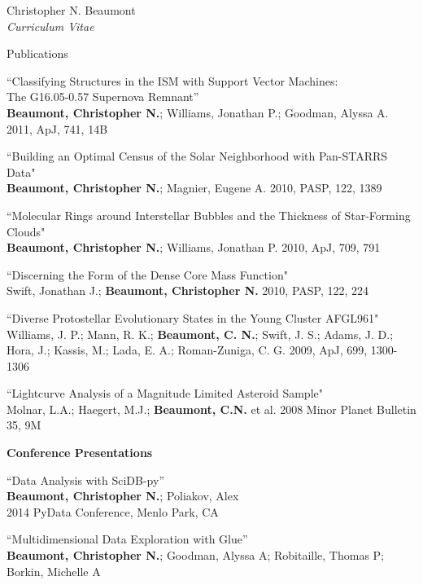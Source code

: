 \documentclass[10pt]{article}
\newenvironment{sublist}{%
	\begin{list}{}{%
		\setlength{\itemsep}{0em}\setlength{\parsep}{0em}%
		\setlength{\topsep}{0em}\setlength{\parskip}{0em}%
	}%
}%
{ \end{list} }
\begin{document}
\begin{cv}{Christopher N. Beaumont\\{\large \itshape Curriculum Vitae}}
\begin{cvlist}{Publications}
\begin{sublist}
	\item ``Classifying Structures in the ISM with Support Vector Machines: \\The G16.05-0.57 Supernova Remnant'' \\
		\textbf{Beaumont, Christopher N.}; Williams, Jonathan P.; Goodman, Alyssa A. 2011, ApJ, 741, 14B\\
	\item ``Building an Optimal Census of the Solar Neighborhood with Pan-STARRS Data" \\
		\textbf{Beaumont, Christopher N.}; Magnier, Eugene A. 2010, PASP, 122, 1389 \\
	\item ``Molecular Rings around Interstellar Bubbles and the Thickness of Star-Forming Clouds" \\
		\textbf{Beaumont, Christopher N.}; Williams, Jonathan P. 2010, ApJ, 709, 791 \\
	\item  ``Discerning the Form of the Dense Core Mass Function" \\
		Swift, Jonathan J.; \textbf{Beaumont, Christopher N.} 2010, PASP, 122, 224 \\
	\item ``Diverse Protostellar Evolutionary States in the Young Cluster AFGL961"  \\
	Williams, J. P.; Mann, R. K.; \textbf{Beaumont, C. N.}; Swift, J. S.; Adams, J. D.; Hora, J.; Kassis, M.; Lada, E. A.; Roman-Zuniga, C. G. 2009, ApJ, 699, 1300-1306\\
	\item ``Lightcurve Analysis of a Magnitude Limited Asteroid Sample" \\
	Molnar, L.A.; Haegert, M.J.; \textbf{Beaumont, C.N.} et al. 2008 Minor Planet Bulletin 35, 9M
	\end{sublist}
	\item \textbf{Conference Presentations}\\
	\begin{sublist}
	\item ``Data Analysis with SciDB-py''\\
	\textbf{Beaumont, Christopher N.}; Poliakov, Alex\\
	2014 PyData Conference, Menlo Park, CA\\
	\item ``Multidimensional Data Exploration with Glue''\\
	\textbf{Beaumont, Christopher N.}; Goodman, Alyssa A; Robitaille, Thomas P;  Borkin, Michelle A \\

\end{sublist}
\end{cvlist}
\end{cv}
\end{document}
